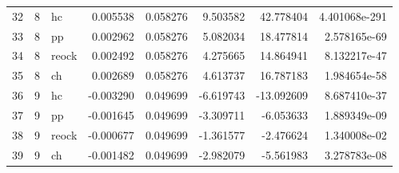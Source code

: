 \documentclass[]{article}
\begin{document}
\begin{tabular}{lrlrrrrr}
32 &      8 &     hc &   0.005538 &  0.058276 &      9.503582 &   42.778404 &  4.401068e-291 \\
33 &      8 &     pp &   0.002962 &  0.058276 &      5.082034 &   18.477814 &   2.578165e-69 \\
34 &      8 &  reock &   0.002492 &  0.058276 &      4.275665 &   14.864941 &   8.132217e-47 \\
35 &      8 &     ch &   0.002689 &  0.058276 &      4.613737 &   16.787183 &   1.984654e-58 \\
36 &      9 &     hc &  -0.003290 &  0.049699 &     -6.619743 &  -13.092609 &   8.687410e-37 \\
37 &      9 &     pp &  -0.001645 &  0.049699 &     -3.309711 &   -6.053633 &   1.889349e-09 \\
38 &      9 &  reock &  -0.000677 &  0.049699 &     -1.361577 &   -2.476624 &   1.340008e-02 \\
39 &      9 &     ch &  -0.001482 &  0.049699 &     -2.982079 &   -5.561983 &   3.278783e-08 \\
\bottomrule
\end{tabular}

\clearpage


\end{document}
